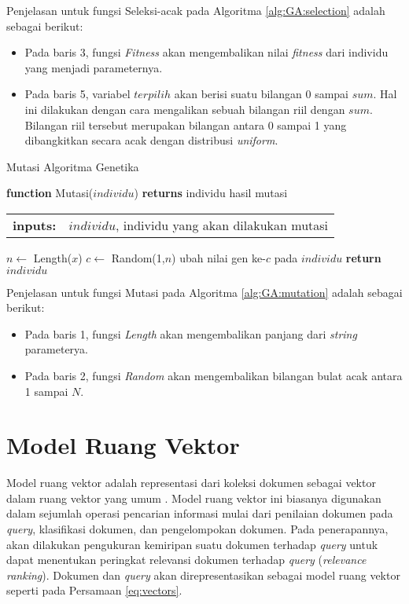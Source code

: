 Penjelasan untuk fungsi Seleksi-acak pada Algoritma \ref{alg:GA:selection} adalah sebagai berikut:
\begin{itemize}
	\item Pada baris 3, fungsi \textit{Fitness} akan mengembalikan nilai \textit{fitness} dari individu yang menjadi parameternya.
	\item Pada baris 5, variabel $terpilih$ akan berisi suatu bilangan 0 sampai $sum$. Hal ini dilakukan dengan cara mengalikan sebuah bilangan riil dengan $sum$. Bilangan riil tersebut merupakan bilangan antara 0 sampai 1 yang dibangkitkan secara acak dengan distribusi \textit{uniform}.
\end{itemize}

\begin{algorithm}[!h]	
	\caption{Mutasi Algoritma Genetika}
	\label{alg:GA:mutation}
	\begin{flushleft}
		\textbf{function} Mutasi($individu$) \textbf{returns} individu hasil mutasi
		\begin{flushleft}
			\begin{tabular}{ l l }
				\textbf{inputs:}& $individu$, individu yang akan dilakukan mutasi
				\hspace{5pt} 
			\end{tabular} 
		\end{flushleft}
	\end{flushleft}
	
	\begin{algorithmic}[1]
		\STATE $n \leftarrow$ Length($x$)
		\STATE $c \leftarrow$ Random(1,$n$)
		\STATE ubah nilai gen ke-$c$ pada $individu$ 
		\STATE \textbf{return} {$individu$}
	\end{algorithmic}
\end{algorithm}

Penjelasan untuk fungsi Mutasi pada Algoritma \ref{alg:GA:mutation} adalah sebagai berikut:
\begin{itemize}
	\item Pada baris 1, fungsi \textit{Length} akan mengembalikan panjang dari \textit{string} parameterya.
	\item Pada baris 2, fungsi \textit{Random} akan mengembalikan bilangan bulat acak antara 1 sampai $N$.
\end{itemize}

\pagebreak
\section{Model Ruang Vektor}
\label{sec:vsm}
Model ruang vektor adalah representasi dari koleksi dokumen sebagai vektor dalam ruang vektor yang umum \cite{schutze2008introduction}. Model ruang vektor ini biasanya digunakan dalam sejumlah operasi pencarian informasi mulai dari penilaian dokumen pada \textit{query}, klasifikasi dokumen, dan pengelompokan dokumen. Pada penerapannya, akan dilakukan pengukuran kemiripan suatu dokumen terhadap \textit{query} untuk dapat menentukan peringkat relevansi dokumen terhadap \textit{query} (\textit{relevance ranking}). Dokumen dan \textit{query} akan direpresentasikan sebagai model ruang vektor seperti pada Persamaan \ref{eq:vectors}.

